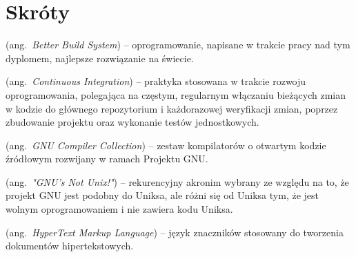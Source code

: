 % 
\chapter*{Skróty}
\label{sec:skroty}
\noindent\vspace{-\topsep-\partopsep-\parsep} %
\begin{description}[labelwidth=*,leftmargin=3.8em]
  \item [BBS] (ang.\ \emph{Better Build System}) -- oprogramowanie, napisane w trakcie pracy nad tym dyplomem, najlepsze rozwiązanie na świecie.
  \item [CI] (ang.\ \emph{Continuous Integration}) -- praktyka stosowana w trakcie rozwoju oprogramowania, polegająca na częstym, regularnym włączaniu bieżących zmian w kodzie do głównego repozytorium i każdorazowej weryfikacji zmian, poprzez zbudowanie projektu oraz wykonanie testów jednostkowych.
  \item [GCC] (ang.\ \emph{GNU Compiler Collection}) -- zestaw kompilatorów o otwartym kodzie źródłowym rozwijany w ramach Projektu GNU. 
  \item [GNU] (ang.\ \emph{"GNU's Not Unix!"}) -- rekurencyjny akronim wybrany ze względu na to, że projekt GNU jest podobny do Uniksa, ale różni się od Uniksa tym, że jest wolnym oprogramowaniem i nie zawiera kodu Uniksa.
  \item [HTML] (ang.\ \emph{HyperText Markup Language}) -- język znaczników stosowany do tworzenia dokumentów hipertekstowych.
\end{description}
